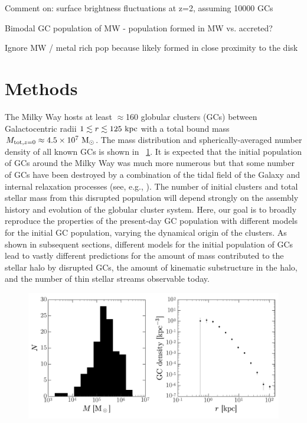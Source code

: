 \documentclass[manuscript, letterpaper]{aastex6}
\begin{document}

Comment on: surface brightness fluctuations at z=2, assuming 10000 GCs

Bimodal GC population of MW - population formed in MW vs. accreted?

Ignore MW / metal rich pop because likely formed in close proximity to the disk

\section{Methods}\label{sec:methods}

The Milky Way hosts at least $\approx$160 globular clusters (GCs) between
Galactocentric radii $1 \lesssim r \lesssim 125~\mathrm{kpc}$ with a total bound mass
$M_{{\rm tot},z=0} \approx 4.5 \times 10^7~\mathrm{M}_\odot$.
The mass distribution and spherically-averaged number density of all known GCs
is shown in \figname~\ref{fig:mw-gc-pop}.
It is expected that the initial population of GCs around the Milky Way was much
more numerous but that some number of GCs have been destroyed by a combination
of the tidal field of the Galaxy and internal relaxation processes (see, e.g.,
\citealt{Gnedin:1997}).
The number of initial clusters and total stellar mass from this disrupted
population will depend strongly on the assembly history and evolution of the
globular cluster system.
Here, our goal is to broadly reproduce the properties of the present-day GC
population with different models for the initial GC population, varying the
dynamical origin of the clusters.
As shown in subsequent sections, different models for the initial population of
GCs lead to vastly different predictions for the amount of mass contributed to
the stellar halo by disrupted GCs, the amount of kinematic substructure in the
halo, and the number of thin stellar streams observable today.

\begin{figure}[h]
\begin{center}
\includegraphics[width=\textwidth]{figures/mass-gcdensity.pdf}
\end{center}
\caption{%
\label{fig:mw-gc-pop}}
\end{figure}
\end{document}
